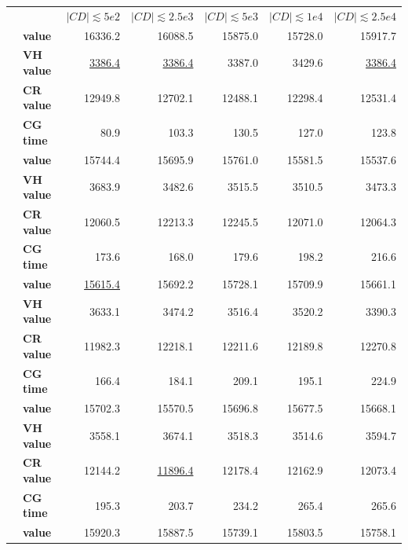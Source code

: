 \documentclass[]{article}
\begin{document}
\begin{table}[h]
  \centering
  \begin{tabular}{llrrrrr}
    \toprule
    && $|CD| \lesssim 5e2$ & $|CD| \lesssim 2.5e3$ & $|CD| \lesssim 5e3$ & $|CD| \lesssim 1e4$ & $|CD| \lesssim 2.5e4$  \\
    \arrayrulecolor{black!30}\cmidrule(lr){1-7}
    \addlinespace[0.4em]
    \multirow{4}{*}{$|VT| \lesssim 5e2$} & \textbf{value}  & 16336.2 & 16088.5 & 15875.0 & 15728.0 & 15917.7 \\
    & \textbf{VH value} & \underline{3386.4} & \underline{3386.4} & 3387.0 & 3429.6 & \underline{3386.4} \\
    & \textbf{CR value} & 12949.8 & 12702.1 & 12488.1 & 12298.4 & 12531.4 \\
    & \textbf{CG time} & 80.9 & 103.3 & 130.5 & 127.0 & 123.8 \\
    \arrayrulecolor{black!30}\cmidrule(lr){1-7}
    \multirow{4}{*}{$|VT| \lesssim 2.5e3$} & \textbf{value}  & 15744.4 & 15695.9 & 15761.0& 15581.5& 15537.6\\
    & \textbf{VH value} & 3683.9 & 3482.6 & 3515.5 & 3510.5 & 3473.3 \\
    & \textbf{CR value} & 12060.5 & 12213.3 & 12245.5 & 12071.0 & 12064.3 \\
    & \textbf{CG time} & 173.6 & 168.0 & 179.6 & 198.2 & 216.6 \\
    \arrayrulecolor{black!30}\cmidrule(lr){1-7}
    \multirow{4}{*}{$|VT| \lesssim 5e3$} & \textbf{value}  & \underline{15615.4} & 15692.2 & 15728.1& 15709.9& 15661.1\\
    & \textbf{VH value} & 3633.1 & 3474.2 & 3516.4 & 3520.2 & 3390.3 \\
    & \textbf{CR value} & 11982.3 & 12218.1 & 12211.6 & 12189.8 & 12270.8 \\
    & \textbf{CG time} & 166.4 & 184.1 & 209.1 & 195.1 & 224.9 \\
    \arrayrulecolor{black!30}\cmidrule(lr){1-7}
    \multirow{4}{*}{$|VT| \lesssim 1e4$} & \textbf{value}  & 15702.3  & 15570.5  & 15696.8 & 15677.5 & 15668.1 \\
    & \textbf{VH value} & 3558.1 & 3674.1 & 3518.3 & 3514.6 & 3594.7 \\
    & \textbf{CR value} & 12144.2 & \underline{11896.4} & 12178.4 & 12162.9 & 12073.4 \\
    & \textbf{CG time} & 195.3 & 203.7 & 234.2 & 265.4 & 265.6 \\
    \arrayrulecolor{black!30}\cmidrule(lr){1-7}
    \multirow{4}{*}{$|VT| \lesssim 2.5e4$} & \textbf{value}  & 15920.3 & 15887.5 & 15739.1& 15803.5& 15758.1\\

\end{tabular}
\end{table}
\end{document}
